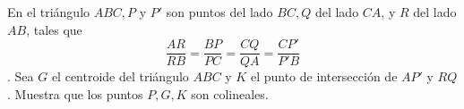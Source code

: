 En el triángulo $ABC, P$ y $P'$ son puntos del lado $BC, Q$ del lado $CA$, y $R $ del lado $AB$, tales que \[\frac{AR}{RB}=\frac{BP}{PC}=\frac{CQ}{QA}=\frac{CP'}{P'B}\] . Sea $G$ el centroide del triángulo $ABC$ y $K$ el punto de intersección de $AP'$ y $RQ$. Muestra que los puntos $P,G,K$ son colineales. 